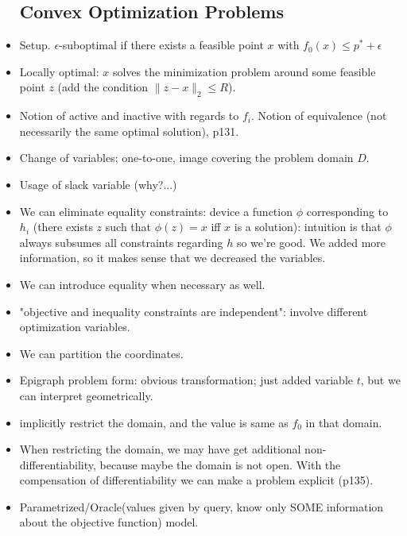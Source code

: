\documentclass{article}
\theoremstyle{remark}
\begin{document}
\begin{itemize}
    \subsection*{Convex Optimization Problems}
    \item Setup. $\epsilon$-suboptimal if there exists a feasible point $x$ with $f_0 (x)\leq p^* +\epsilon$
    \item Locally optimal: $x$ solves the minimization problem around some feasible point $z$ (add the condition $\lVert z-x\rVert_2\leq R$).
    \item Notion of active and inactive with regards to $f_i$. Notion of equivalence (not necessarily the same optimal solution), p131.
    \item Change of variables; one-to-one, image covering the problem domain $D$.
    \item Usage of slack variable (why?...)
    \item We can eliminate equality constraints: device a function $\phi$ corresponding to $h_i$ (there exists $z$ such that $\phi(z)=x$ iff $x$ is a solution): intuition is that $\phi$ always subsumes all constraints regarding $h$ so we're good. We added more information, so it makes sense that we decreased the variables.
    \item We can introduce equality when necessary as well.
    \item "objective and inequality constraints are independent": involve different optimization variables. 
    \item We can partition the coordinates.
    \item Epigraph problem form: obvious transformation; just added variable $t$, but we can interpret geometrically.
    \item implicitly restrict the domain, and the value is same as $f_0$ in that domain.
    \item When restricting the domain, we may have get additional non-differentiability, because maybe the domain is not open. With the compensation of differentiability we can make a problem explicit (p135).
    \item Parametrized/Oracle(values given by query, know only SOME information about the objective function) model.

\end{itemize}
\end{document}
